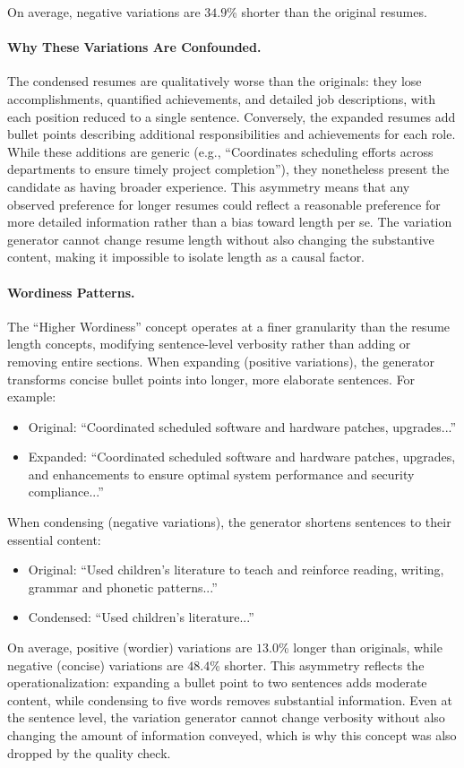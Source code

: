 On average, negative variations are $34.9$\% shorter than the original resumes.

\paragraph{Why These Variations Are Confounded.} The condensed resumes are qualitatively worse than the originals: they lose accomplishments, quantified achievements, and detailed job descriptions, with each position reduced to a single sentence. Conversely, the expanded resumes add bullet points describing additional responsibilities and achievements for each role. While these additions are generic (e.g., ``Coordinates scheduling efforts across departments to ensure timely project completion''), they nonetheless present the candidate as having broader experience. This asymmetry means that any observed preference for longer resumes could reflect a reasonable preference for more detailed information rather than a bias toward length per se. The variation generator cannot change resume length without also changing the substantive content, making it impossible to isolate length as a causal factor.

\paragraph{Wordiness Patterns.} The ``Higher Wordiness'' concept operates at a finer granularity than the resume length concepts, modifying sentence-level verbosity rather than adding or removing entire sections. When expanding (positive variations), the generator transforms concise bullet points into longer, more elaborate sentences. For example:

\begin{itemize}
    \item Original: ``Coordinated scheduled software and hardware patches, upgrades...''
    \item Expanded: ``Coordinated scheduled software and hardware patches, upgrades, and enhancements to ensure optimal system performance and security compliance...''
\end{itemize}

When condensing (negative variations), the generator shortens sentences to their essential content:

\begin{itemize}
    \item Original: ``Used children's literature to teach and reinforce reading, writing, grammar and phonetic patterns...''
    \item Condensed: ``Used children's literature...''
\end{itemize}

On average, positive (wordier) variations are $13.0$\% longer than originals, while negative (concise) variations are $48.4$\% shorter. This asymmetry reflects the operationalization: expanding a bullet point to two sentences adds moderate content, while condensing to five words removes substantial information. Even at the sentence level, the variation generator cannot change verbosity without also changing the amount of information conveyed, which is why this concept was also dropped by the quality check.
